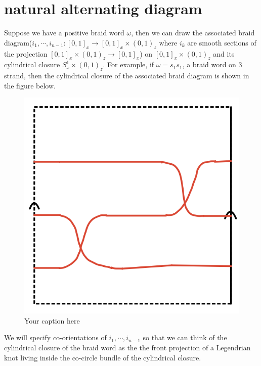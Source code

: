 \section{natural alternating diagram}

Suppose we have a positive braid word $\omega$, then we can draw the associated braid diagram($i_1,\cdots,i_{n-1}: [0,1]_{x}\rightarrow [0,1]_{x} \times (0,1)_{z}$ where $i_{k}$ are smooth sections of the projection $[0,1]_{x} \times (0,1)_{z} \rightarrow [0,1]_{x}$) on $[0,1]_{x} \times (0,1)_{z}$ and its cylindrical closure $S^{1}_{x} \times (0,1)_{z}$. For example, if $\omega = s_{1}s_{1}$, a braid word on $3$ strand, then the cylindrical closure of the associated braid diagram is shown in the figure below.

\begin{figure}[H] 
    \centering
    \includegraphics[scale = 0.95]{diagrams/natural_alternating_diagrams/1.png}
    \caption{Your caption here}
    \label{fig:your-label}
\end{figure}


We will specify co-orientations of $i_1, \cdots, i_{n-1}$ so that we can think of the cylindrical closure of the braid word as the the front projection of a Legendrian knot living inside the co-circle bundle of the cylindrical closure.

